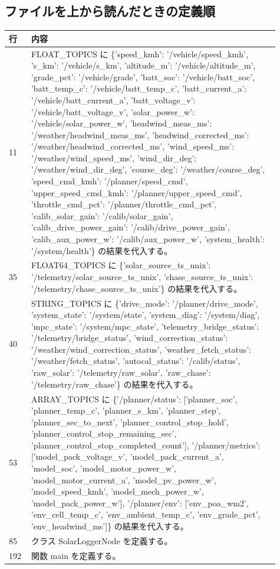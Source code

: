 \documentclass[a4paper,11pt]{article}
\begin{document}
        \subsection*{ファイルを上から読んだときの定義順}
            \begin{longtable}{p{0.07\linewidth} p{0.84\linewidth}}
            \toprule
            行 & 内容 \\
            \midrule
            11 & FLOAT\_TOPICS に \{'speed\_kmh': '/vehicle/speed\_kmh', 's\_km': '/vehicle/s\_km', 'altitude\_m': '/vehicle/altitude\_m', 'grade\_pct': '/vehicle/grade', 'batt\_soc': '/vehicle/batt\_soc', 'batt\_temp\_c': '/vehicle/batt\_temp\_c', 'batt\_current\_a': '/vehicle/batt\_current\_a', 'batt\_voltage\_v': '/vehicle/batt\_voltage\_v', 'solar\_power\_w': '/vehicle/solar\_power\_w', 'headwind\_meas\_ms': '/weather/headwind\_meas\_ms', 'headwind\_corrected\_ms': '/weather/headwind\_corrected\_ms', 'wind\_speed\_ms': '/weather/wind\_speed\_ms', 'wind\_dir\_deg': '/weather/wind\_dir\_deg', 'course\_deg': '/weather/course\_deg', 'speed\_cmd\_kmh': '/planner/speed\_cmd', 'upper\_speed\_cmd\_kmh': '/planner/upper\_speed\_cmd', 'throttle\_cmd\_pct': '/planner/throttle\_cmd\_pct', 'calib\_solar\_gain': '/calib/solar\_gain', 'calib\_drive\_power\_gain': '/calib/drive\_power\_gain', 'calib\_aux\_power\_w': '/calib/aux\_power\_w', 'system\_health': '/system/health'\} の結果を代入する。 \\
35 & FLOAT64\_TOPICS に \{'solar\_source\_ts\_unix': '/telemetry/solar\_source\_ts\_unix', 'chase\_source\_ts\_unix': '/telemetry/chase\_source\_ts\_unix'\} の結果を代入する。 \\
40 & STRING\_TOPICS に \{'drive\_mode': '/planner/drive\_mode', 'system\_state': '/system/state', 'system\_diag': '/system/diag', 'mpc\_state': '/system/mpc\_state', 'telemetry\_bridge\_status': '/telemetry/bridge\_status', 'wind\_correction\_status': '/weather/wind\_correction\_status', 'weather\_fetch\_status': '/weather/fetch\_status', 'autocal\_status': '/calib/status', 'raw\_solar': '/telemetry/raw\_solar', 'raw\_chase': '/telemetry/raw\_chase'\} の結果を代入する。 \\
53 & ARRAY\_TOPICS に \{'/planner/status': ['planner\_soc', 'planner\_temp\_c', 'planner\_s\_km', 'planner\_step', 'planner\_sec\_to\_next', 'planner\_control\_stop\_hold', 'planner\_control\_stop\_remaining\_sec', 'planner\_control\_stop\_completed\_count'], '/planner/metrics': ['model\_pack\_voltage\_v', 'model\_pack\_current\_a', 'model\_soc', 'model\_motor\_power\_w', 'model\_motor\_current\_a', 'model\_pv\_power\_w', 'model\_speed\_kmh', 'model\_mech\_power\_w', 'model\_pack\_power\_w'], '/planner/env': ['env\_poa\_wm2', 'env\_cell\_temp\_c', 'env\_ambient\_temp\_c', 'env\_grade\_pct', 'env\_headwind\_ms']\} の結果を代入する。 \\
85 & クラス SolarLoggerNode を定義する。 \\
192 & 関数 main を定義する。 \\
            \bottomrule
            \end{longtable}
\end{document}
